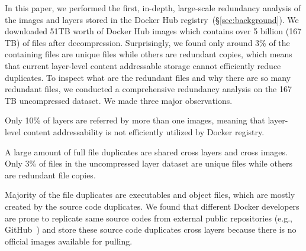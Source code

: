 In this paper, we performed the first, in-depth, large-scale redundancy
analysis of the images and layers stored in the Docker Hub
registry~(\S\ref{sec:background}).
%
We downloaded 51TB worth of Docker Hub images which contains over 5 billion (167 TB)
of files after decompression.
%
%
%
%
Surprisingly, we found only around 3\% of the containing files are unique files
while others are redundant copies, which means that current layer-level content
addressable storage cannot efficiently reduce duplicates.
%
To inspect what are the redundant files and why there are so many redundant
files, we conducted a comprehensive redundancy analysis on the 167 TB
uncompressed dataset.
%
We made three major observations.
%
\begin{compactitemize}
%
\item Only 10\% of layers are referred by more than one images, 
meaning that layer-level content addressability is not efficiently utilized by Docker registry.
%
\item A large amount of full file duplicates are shared cross layers and cross images. 
Only 3\% of files in the uncompressed layer dataset are unique files while others are redundant file copies.
%
\item Majority of the file duplicates are executables and object files, which are mostly created by the source code duplicates.
%
We found that different Docker developers are prone to replicate same source codes from external public repositories (e.g., GitHub~\cite{xxx}) and store these source code duplicates cross layers because there is no official images available for pulling.  

\end{compactitemize}

